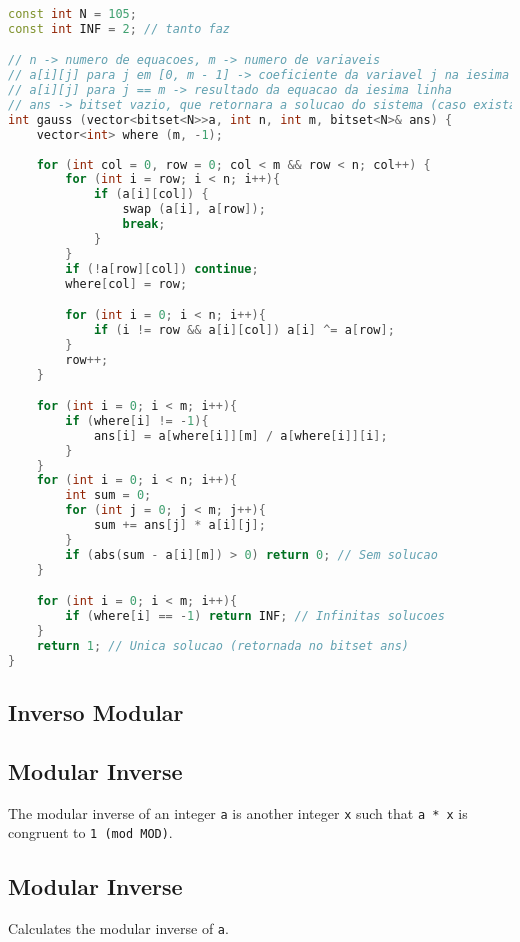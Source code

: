 \documentclass[11pt, a4paper, twoside]{article}
\begin{document}
\begin{lstlisting}[language=C++]
const int N = 105;
const int INF = 2; // tanto faz

// n -> numero de equacoes, m -> numero de variaveis
// a[i][j] para j em [0, m - 1] -> coeficiente da variavel j na iesima equacao
// a[i][j] para j == m -> resultado da equacao da iesima linha
// ans -> bitset vazio, que retornara a solucao do sistema (caso exista)
int gauss (vector<bitset<N>>a, int n, int m, bitset<N>& ans) {
    vector<int> where (m, -1);
    
    for (int col = 0, row = 0; col < m && row < n; col++) {
        for (int i = row; i < n; i++){
            if (a[i][col]) {
                swap (a[i], a[row]);
                break;
            }
        }
        if (!a[row][col]) continue;
        where[col] = row;

        for (int i = 0; i < n; i++){
            if (i != row && a[i][col]) a[i] ^= a[row];
        }
        row++;
    }

    for (int i = 0; i < m; i++){
        if (where[i] != -1){
            ans[i] = a[where[i]][m] / a[where[i]][i];
        }
    }
    for (int i = 0; i < n; i++){
        int sum = 0;
        for (int j = 0; j < m; j++){
            sum += ans[j] * a[i][j];
        }
        if (abs(sum - a[i][m]) > 0) return 0; // Sem solucao
    }

    for (int i = 0; i < m; i++){
        if (where[i] == -1) return INF; // Infinitas solucoes
    }
    return 1; // Unica solucao (retornada no bitset ans)
}
\end{lstlisting}

\subsection{Inverso Modular}

\subsection{Modular Inverse}


The modular inverse of an integer \lstinline{a} is another integer \lstinline{x} such that \lstinline{a * x} is congruent to \lstinline{1 (mod MOD)}.

\subsection{Modular Inverse}


Calculates the modular inverse of \lstinline{a}.
\end{document}
